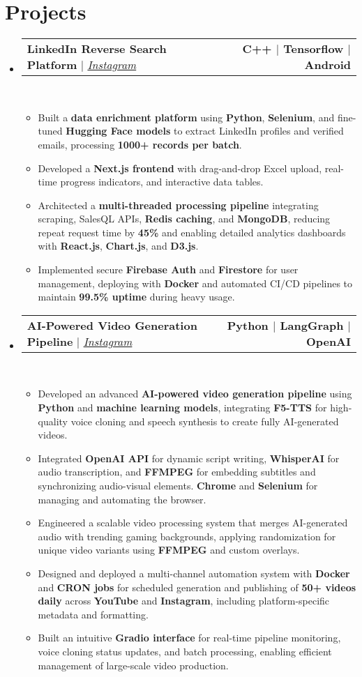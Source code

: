 \documentclass[letterpaper,10pt]{article}
\makeatletter
\newcommand{\resumeItem}[1]{
  \item\small{
    {#1 \vspace{0pt}}
  }
}
\newcommand{\resumeProjectHeading}[2]{
  \item
  \begin{tabular*}{1.001\textwidth}{l@{\extracolsep{\fill}}r}
    \small#1 & \textbf{\small #2}\\
  \end{tabular*}\vspace{-7pt}
}
\newcommand{\resumeSubHeadingListStart}{\begin{itemize}[leftmargin=0.0in, label={}]}
\newcommand{\resumeSubHeadingListEnd}{\end{itemize}}\vspace{0pt}
\newcommand{\resumeItemListStart}{\begin{itemize}[leftmargin=0.15in]}
\newcommand{\resumeItemListEnd}{\end{itemize}\vspace{-5pt}}
\makeatother
\begin{document}
\section{Projects} 
  \vspace{-5pt}
    \resumeSubHeadingListStart
      \resumeProjectHeading{\textbf{{LinkedIn Reverse Search Platform}} $|$ \emph{\href{https://www.instagram.com/thatvocabguy/}{Instagram}}}{C++ $|$ Tensorflow $|$ Android} \\[5mm]
        \resumeItemListStart
          \resumeItem{Built a \textbf{data enrichment platform} using \textbf{Python}, \textbf{Selenium}, and fine-tuned \textbf{Hugging Face models} to extract LinkedIn profiles and verified emails, processing \textbf{1000+ records per batch}.}
          \resumeItem{Developed a \textbf{Next.js frontend} with drag-and-drop Excel upload, real-time progress indicators, and interactive data tables.}
          \resumeItem{Architected a \textbf{multi-threaded processing pipeline} integrating scraping, SalesQL APIs, \textbf{Redis caching}, and \textbf{MongoDB}, reducing repeat request time by \textbf{45\%} and enabling detailed analytics dashboards with \textbf{React.js}, \textbf{Chart.js}, and \textbf{D3.js}.}
          \resumeItem{Implemented secure \textbf{Firebase Auth} and \textbf{Firestore} for user management, deploying with \textbf{Docker} and automated CI/CD pipelines to maintain \textbf{99.5\% uptime} during heavy usage.}
        \resumeItemListEnd
      \vspace{-20pt}
      \resumeProjectHeading{\textbf{{AI-Powered Video Generation Pipeline}} $|$ \emph{\href{https://www.instagram.com/thatvocabguy/}{Instagram}}}{Python $|$ LangGraph $|$ OpenAI} \\[5mm]
        \resumeItemListStart
          \resumeItem{Developed an advanced \textbf{AI-powered video generation pipeline} using \textbf{Python} and \textbf{machine learning models}, integrating \textbf{F5-TTS} for high-quality voice cloning and speech synthesis to create fully AI-generated videos.}
          \resumeItem{Integrated \textbf{OpenAI API} for dynamic script writing, \textbf{WhisperAI} for audio transcription, and \textbf{FFMPEG} for embedding subtitles and synchronizing audio-visual elements. \textbf{Chrome} and \textbf{Selenium} for managing and automating the browser.}
          \resumeItem{Engineered a scalable video processing system that merges AI-generated audio with trending gaming backgrounds, applying randomization for unique video variants using \textbf{FFMPEG} and custom overlays.}
          \resumeItem{Designed and deployed a multi-channel automation system with \textbf{Docker} and \textbf{CRON jobs} for scheduled generation and publishing of \textbf{50+ videos daily} across \textbf{YouTube} and \textbf{Instagram}, including platform-specific metadata and formatting.}
          \resumeItem{Built an intuitive \textbf{Gradio interface} for real-time pipeline monitoring, voice cloning status updates, and batch processing, enabling efficient management of large-scale video production.}
        \resumeItemListEnd
    \resumeSubHeadingListEnd
    \vspace{-20pt}
\vspace{10pt}

\vspace{-15pt}
\end{document}
